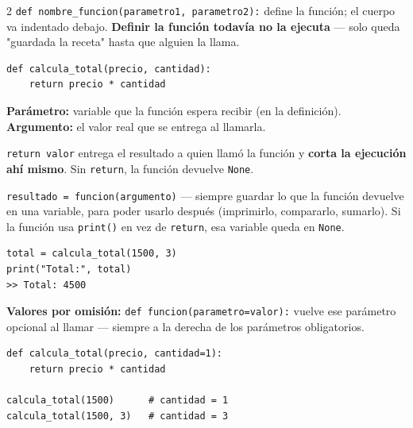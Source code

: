 \documentclass[10pt]{article}
\begin{document}
\begin{multicols}{2}
\texttt{def nombre\_funcion(parametro1, parametro2):} define la función; el cuerpo va indentado debajo. \textbf{Definir la función todavía no la ejecuta} --- solo queda "guardada la receta" hasta que alguien la llama.

\begin{cajacodigo}
\begin{Verbatim}[fontsize=\footnotesize]
def calcula_total(precio, cantidad):
    return precio * cantidad
\end{Verbatim}
\end{cajacodigo}

\textbf{Parámetro:} variable que la función espera recibir (en la definición). \textbf{Argumento:} el valor real que se entrega al llamarla.

\texttt{return valor} entrega el resultado a quien llamó la función y \textbf{corta la ejecución ahí mismo}. Sin \texttt{return}, la función devuelve \texttt{None}.

\begin{formulabox}
\footnotesize
\texttt{resultado = funcion(argumento)} --- siempre guardar lo que la función devuelve en una variable, para poder usarlo después (imprimirlo, compararlo, sumarlo). Si la función usa \texttt{print()} en vez de \texttt{return}, esa variable queda en \texttt{None}.
\end{formulabox}

\begin{cajacodigo}
\begin{Verbatim}[fontsize=\footnotesize]
total = calcula_total(1500, 3)
print("Total:", total)
>> Total: 4500
\end{Verbatim}
\end{cajacodigo}

\textbf{Valores por omisión:} \texttt{def funcion(parametro=valor):} vuelve ese parámetro opcional al llamar --- siempre a la derecha de los parámetros obligatorios.

\begin{cajacodigo}
\begin{Verbatim}[fontsize=\footnotesize]
def calcula_total(precio, cantidad=1):
    return precio * cantidad

calcula_total(1500)      # cantidad = 1
calcula_total(1500, 3)   # cantidad = 3
\end{Verbatim}
\end{cajacodigo}

\end{multicols}
\end{document}
